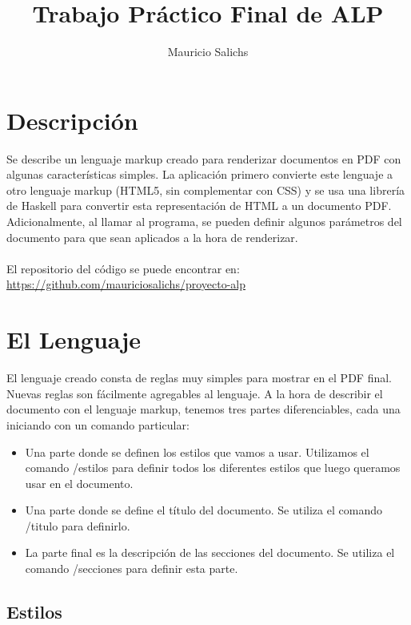 \documentclass{article}
\title{Trabajo Práctico Final de ALP}
\author{Mauricio Salichs}
\date{}
\begin{document}
\maketitle

\section{Descripción}

Se describe un lenguaje markup creado para renderizar documentos en PDF con algunas características simples. La aplicación primero convierte este lenguaje a otro lenguaje markup (HTML5, sin complementar con CSS) y se usa una librería de Haskell para convertir esta representación de HTML a un documento PDF. Adicionalmente, al llamar al programa, se pueden definir algunos parámetros del documento para que sean aplicados a la hora de renderizar.
\\~\\
El repositorio del código se puede encontrar en:\\
\url{https://github.com/mauriciosalichs/proyecto-alp}

\section{El Lenguaje}
El lenguaje creado consta de reglas muy simples para mostrar en el PDF final. Nuevas reglas son fácilmente agregables al lenguaje. A la hora de describir el documento con el lenguaje markup, tenemos tres partes diferenciables, cada una iniciando con un comando particular:
\begin{itemize}
    \item Una parte donde se definen los estilos que vamos a usar. Utilizamos el comando /estilos para definir todos los diferentes estilos que luego queramos usar en el documento.
    \item Una parte donde se define el título del documento. Se utiliza el comando /titulo para definirlo.
    \item La parte final es la descripción de las secciones del documento. Se utiliza el comando /secciones para definir esta parte.
\end{itemize}

\subsection{Estilos}
\end{document}
